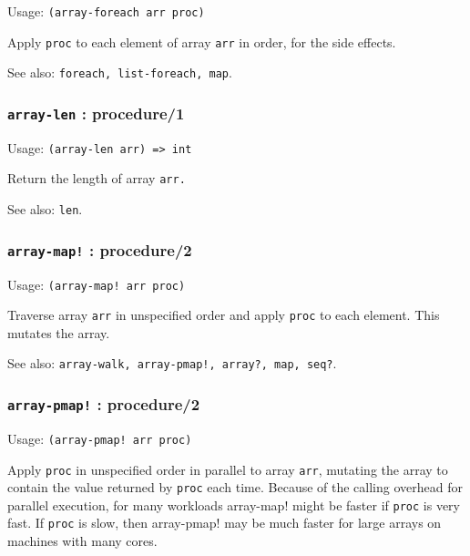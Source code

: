 \documentclass[
]{article}
\newcommand{\passthrough}[1]{#1}
\begin{document}
Usage: \passthrough{\lstinline!(array-foreach arr proc)!}

Apply \passthrough{\lstinline!proc!} to each element of array
\passthrough{\lstinline!arr!} in order, for the side effects.

See also: \passthrough{\lstinline!foreach, list-foreach, map!}.

\hypertarget{array-len-procedure1}{%
\subsubsection{\texorpdfstring{\texttt{array-len} :
procedure/1}{array-len : procedure/1}}\label{array-len-procedure1}}

Usage: \passthrough{\lstinline!(array-len arr) => int!}

Return the length of array \passthrough{\lstinline!arr.!}

See also: \passthrough{\lstinline!len!}.

\hypertarget{array-map-procedure2}{%
\subsubsection{\texorpdfstring{\texttt{array-map!} :
procedure/2}{array-map! : procedure/2}}\label{array-map-procedure2}}

Usage: \passthrough{\lstinline"(array-map! arr proc)"}

Traverse array \passthrough{\lstinline!arr!} in unspecified order and
apply \passthrough{\lstinline!proc!} to each element. This mutates the
array.

See also:
\passthrough{\lstinline"array-walk, array-pmap!, array?, map, seq?"}.

\hypertarget{array-pmap-procedure2}{%
\subsubsection{\texorpdfstring{\texttt{array-pmap!} :
procedure/2}{array-pmap! : procedure/2}}\label{array-pmap-procedure2}}

Usage: \passthrough{\lstinline"(array-pmap! arr proc)"}

Apply \passthrough{\lstinline!proc!} in unspecified order in parallel to
array \passthrough{\lstinline!arr!}, mutating the array to contain the
value returned by \passthrough{\lstinline!proc!} each time. Because of
the calling overhead for parallel execution, for many workloads
array-map! might be faster if \passthrough{\lstinline!proc!} is very
fast. If \passthrough{\lstinline!proc!} is slow, then array-pmap! may be
much faster for large arrays on machines with many cores.
\end{document}
